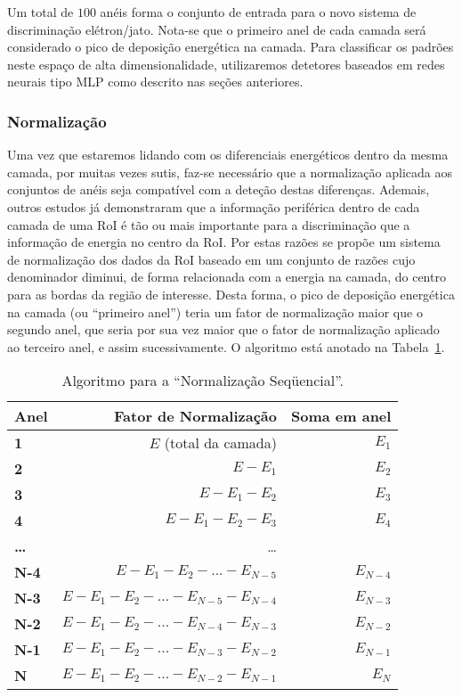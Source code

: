 Um total de $100$ anéis forma o conjunto de entrada para o novo sistema de
discriminação elétron/jato. Nota-se que o primeiro anel de cada camada será
considerado o pico de deposição energética na camada. Para classificar os
padrões neste espaço de alta dimensionalidade, utilizaremos detetores baseados
em redes neurais tipo MLP como descrito nas seções anteriores.

\subsubsection{Normalização}

Uma vez que estaremos lidando com os diferenciais energéticos dentro da mesma
camada, por muitas vezes sutis, faz-se necessário que a normalização aplicada
aos conjuntos de anéis seja compatível com a deteção destas
diferenças. Ademais, outros estudos \cite{vassali-acat-2001} já demonstraram
que a informação periférica dentro de cada camada de uma RoI é tão ou mais
importante para a discriminação que a informação de energia no centro da
RoI. Por estas razões se propõe um sistema de normalização dos dados da RoI
baseado em um conjunto de razões cujo denominador diminui, de forma
relacionada com a energia na camada, do centro para as bordas da região de
interesse. Desta forma, o pico de deposição energética na camada (ou
``primeiro anel'') teria um fator de normalização maior que o segundo anel,
que seria por sua vez maior que o fator de normalização aplicado ao terceiro
anel, e assim sucessivamente. O algoritmo está anotado na
Tabela~\ref{tab:seq}.

\begin{table}
\renewcommand{\baselinestretch}{1.5}
\caption{Algoritmo para a ``Normalização Seqüencial''.}
\label{tab:seq}
\renewcommand{\baselinestretch}{1}
\begin{center}
\begin{tabular}{>{\bfseries}l r r}
Anel & Fator de Normalização & Soma em anel \\ \hline
1 & $E$ (total da camada) & $E_1$\\
2 & $E - E_1$ & $E_2$ \\
3 & $E - E_1 - E_2$ & $E_3$\\
4 & $E - E_1 - E_2 - E_3$ & $E_4$\\
\dots  & \dots \\
N-4 & $E - E_1 - E_2 - ... - E_{N-5}$ & $E_{N-4}$ \\
N-3 & $E - E_1 - E_2 - ... - E_{N-5} - E_{N-4}$ & $E_{N-3}$ \\
N-2 & $E - E_1 - E_2 - ... - E_{N-4} - E_{N-3}$ & $E_{N-2}$ \\
N-1 & $E - E_1 - E_2 - ... - E_{N-3} - E_{N-2}$ & $E_{N-1}$ \\
N & $E - E_1 - E_2 - ... - E_{N-2} - E_{N-1}$ & $E_N$ \\
\end{tabular}
\end{center}
\end{table}

